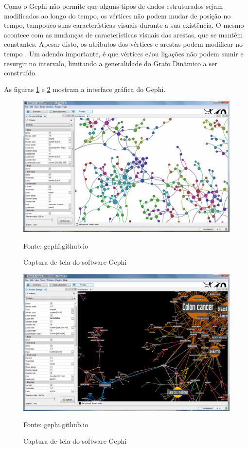 Como o Gephi não permite que alguns tipos de dados estruturados sejam modificados ao longo do tempo,
os vértices não podem mudar de posição no tempo, tampouco suas características visuais durante a sua existência.
O mesmo acontece com as mudanças de características visuais das arestas, que se mantêm constantes. Apesar
disto, os atributos dos vértices e arestas podem modificar no tempo \cite{dynagraph}. Um adendo importante,
é que vértices e/ou ligações não podem sumir e resurgir no intervalo, limitando a generalidade do Grafo Dinâmico
a ser construído.

As figuras \ref{fig:gephiUm} e \ref{fig:gephiDois} mostram a interface gráfica do Gephi.

\begin{figure}[htbp]
\centering
 \includegraphics[width=.90\textwidth]{figuras/gephiUm.png}
\caption{Captura de tela do software Gephi}
Fonte: gephi.github.io
\label{fig:gephiUm}
\end{figure}

\begin{figure}[htbp]
\centering
 \includegraphics[width=.90\textwidth]{figuras/gephiDois.png}
\caption{Captura de tela do software Gephi}
Fonte: gephi.github.io
\label{fig:gephiDois}
\end{figure}
\FloatBarrier

